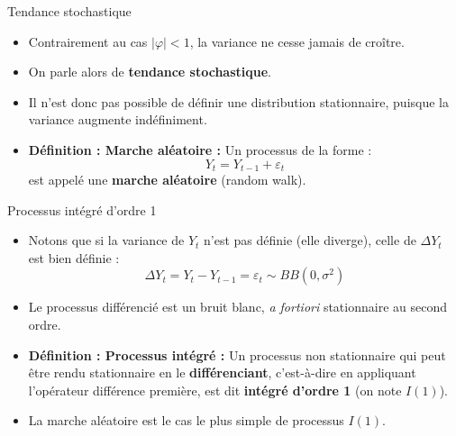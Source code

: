 \documentclass[11pt,aspectratio=169]{beamer}
\begin{document}
\begin{frame}{Tendance stochastique}

\begin{itemize}

\item Contrairement au cas $|\varphi| < 1$, la variance ne cesse jamais de croître.\newline

\item On parle alors de \textbf{tendance stochastique}.\newline

\item Il n'est donc pas possible de définir une distribution stationnaire, puisque la variance augmente indéfiniment.\newline

\item \textbf{Définition : Marche aléatoire :} Un processus de la forme :
\[
Y_t = Y_{t-1} + \varepsilon_t
\]
est appelé une \textbf{marche aléatoire} (random walk).

\end{itemize}
\end{frame}

\begin{frame}{Processus intégré d'ordre 1}

\begin{itemize}

\item Notons que si la variance de $Y_t$ n'est pas définie (elle diverge), celle de $\Delta Y_t$ est bien définie :
\[
\Delta Y_t = Y_t - Y_{t-1} = \varepsilon_t \sim BB(0, \sigma^2)
\]

\item Le processus différencié est un bruit blanc, \textit{a fortiori} stationnaire au second ordre.\newline

\item \textbf{Définition : Processus intégré :} Un processus non stationnaire qui peut être rendu stationnaire en le \textbf{différenciant}, c'est-à-dire en appliquant l'opérateur différence première, est dit \textbf{intégré d'ordre 1} (on note $I(1)$).\newline

\item La marche aléatoire est le cas le plus simple de processus $I(1)$.

\end{itemize}
\end{frame}
\end{document}

